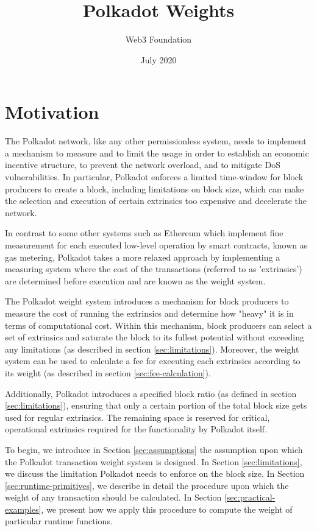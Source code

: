 \documentclass[11pt,a4paper]{article}
\begin{document}
\title{Polkadot Weights}
\author{Web3 Foundation}
\date{July 2020}
\maketitle

\tableofcontents
\newpage

\section{Motivation}

The Polkadot network, like any other permissionless system, needs to implement a
mechanism to measure and to limit the usage in order to establish an economic
incentive structure, to prevent the network overload, and to mitigate DoS
vulnerabilities. In particular, Polkadot enforces a limited time-window for
block producers to create a block, including limitations on block size, which
can make the selection and execution of certain extrinsics too expensive and
decelerate the network.
\newline

In contrast to some other systems such as Ethereum which implement fine
measurement for each executed low-level operation by smart contracts, known as
gas metering, Polkadot takes a more relaxed approach by implementing a measuring
system where the cost of the transactions (referred to as 'extrinsics') are
determined before execution and are known as the weight system.

The Polkadot weight system introduces a mechanism for block producers to measure
the cost of running the extrinsics and determine how "heavy" it is in terms of
computational cost. Within this mechanism, block producers can select a set of
extrinsics and saturate the block to its fullest potential without exceeding any
limitations (as described in section \ref{sec:limitations}). Moreover, the
weight system can be used to calculate a fee for executing each extrinsics
according to its weight (as described in section \ref{sec:fee-calculation}).
\newline

Additionally, Polkadot introduces a specified block ratio (as defined in section
\ref{sec:limitations}), ensuring that only a certain portion of the total block
size gets used for regular extrinsics. The remaining space is reserved for
critical, operational extrinsics required for the functionality by Polkadot
itself.

To begin, we introduce in Section \ref{sec:assumptions} the assumption upon
which the Polkadot transaction weight system is designed. In Section
\ref{sec:limitations}, we discuss the limitation Polkadot needs to enforce on
the block size. In Section \ref{sec:runtime-primitives}, we describe in detail
the procedure upon which the weight of any transaction should be calculated. In
Section \ref{sec:practical-examples}, we present how we apply this procedure to
compute the weight of particular runtime functions.
\end{document}
